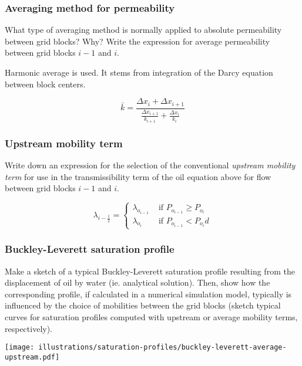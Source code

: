 \subsubsection{Averaging method for permeability} %
\label{ssub:averaging_method}

\begin{question}
  What type of averaging method is normally applied to absolute permeability between grid blocks? Why? Write the expression for average permeability between grid blocks $i-1$ and $i$.
\end{question}

Harmonic average is used. It stems from integration of the Darcy equation between block centers.

\begin{equation}
  \bar{k} = \frac{\Delta x_i + \Delta x_{i+1}}{\frac{\Delta x_{i+1}}{k_{i+1}} + \frac{\Delta x_i}{k_i}}
\end{equation}

\subsubsection{Upstream mobility term} %
\label{ssub:upstream_mobility_term}

\begin{question}
  Write down an expression for the selection of the conventional \emph{upstream mobility term} for use in the transmissibility term of the oil equation above for flow between grid blocks $i-1$ and $i$.
\end{question}

\begin{equation}
  \lambda_{i-\frac{1}{2}} =
  \begin{cases}
    \lambda_{o_{i-1}} & \text{ if } P_{o_{i-1}} \geq P_{o_i} \\
    \lambda_{o_i}     & \text{ if } P_{o_{i-1}} < P_{o_i} d
  \end{cases}
\end{equation}

\subsubsection{Buckley-Leverett saturation profile} %
\label{ssub:buckley_leverett_saturation_profile}

\begin{question}
  Make a sketch of a typical Buckley-Leverett saturation profile resulting from the displacement of oil by water (ie. analytical solution). Then, show how the corresponding profile, if calculated in a numerical simulation model, typically is influenced by the choice of mobilities between the grid blocks (sketch typical curves for saturation profiles computed with upstream or average mobility terms, respectively).
\end{question}

\begin{center}
  \texttt{[image: illustrations/saturation-profiles/buckley-leverett-average-upstream.pdf]}
\end{center}



